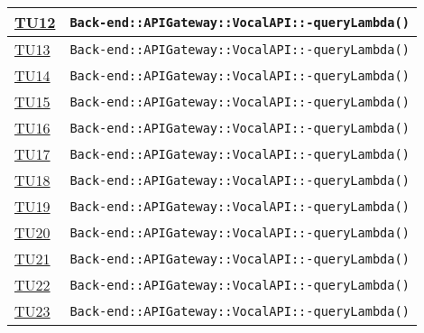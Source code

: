 \begin{longtable}{|>{\centering}m{1cm}|m{12cm}<{\centering}|}
\hyperlink{TU12}{TU12} & \texttt{Back-end::APIGateway::VocalAPI::-\linebreak queryLambda()}\\ \hline

\hyperlink{TU13}{TU13} & \texttt{Back-end::APIGateway::VocalAPI::-\linebreak queryLambda()}\\ \hline

\hyperlink{TU14}{TU14} & \texttt{Back-end::APIGateway::VocalAPI::-\linebreak queryLambda()}\\ \hline

\hyperlink{TU15}{TU15} & \texttt{Back-end::APIGateway::VocalAPI::-\linebreak queryLambda()}\\ \hline

\hyperlink{TU16}{TU16} & \texttt{Back-end::APIGateway::VocalAPI::-\linebreak queryLambda()}\\ \hline

\hyperlink{TU17}{TU17} & \texttt{Back-end::APIGateway::VocalAPI::-\linebreak queryLambda()}\\ \hline

\hyperlink{TU18}{TU18} & \texttt{Back-end::APIGateway::VocalAPI::-\linebreak queryLambda()}\\ \hline

\hyperlink{TU19}{TU19} & \texttt{Back-end::APIGateway::VocalAPI::-\linebreak queryLambda()}\\ \hline

\hyperlink{TU20}{TU20} & \texttt{Back-end::APIGateway::VocalAPI::-\linebreak queryLambda()}\\ \hline

\hyperlink{TU21}{TU21} & \texttt{Back-end::APIGateway::VocalAPI::-\linebreak queryLambda()}\\ \hline

\hyperlink{TU22}{TU22} & \texttt{Back-end::APIGateway::VocalAPI::-\linebreak queryLambda()}\\ \hline

\hyperlink{TU23}{TU23} & \texttt{Back-end::APIGateway::VocalAPI::-\linebreak queryLambda()}\\ \hline


\end{longtable}
